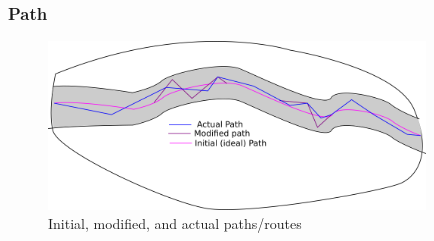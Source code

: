 \documentclass{beamer}
\begin{document}
\begin{frame}
\frametitle{Path}
\begin{figure}
\centering
\includegraphics[width=100mm]{pics/diagramTrial1.png}
\caption{Initial, modified, and actual paths/routes}\label{fig:A2}
\end{figure}

\end{frame}
\end{document}
